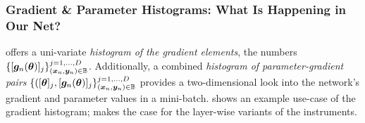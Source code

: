 \subsubsection{Gradient \& Parameter Histograms: What Is Happening in Our Net?}

\cockpit offers a uni-variate \textit{histogram of the gradient elements}, \ie
the numbers
$\{[{\bm{g}}_n( {\bm{\theta}} )]_j\}_{({\bm{x}}_{n}, {\bm{y}}_{n})\in {\mathbb{B}}}^{j=1,\dots,D}$.
Additionally, a combined \textit{histogram of parameter-gradient pairs}
$\{([{\bm{\theta}}]_j, [{\bm{g}}_n( {\bm{\theta}} )]_j\}_{({\bm{x}}_{n}, {\bm{y}}_{n})\in {\mathbb{B}}}^{j=1,\dots,D}$
provides a two-dimensional look into the network's gradient and parameter values
in a mini-batch.  shows an example
use-case of the gradient histogram; 
makes the case for the layer-wise variants of the instruments.

